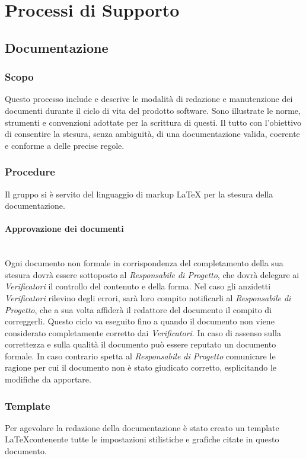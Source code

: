 \section{Processi di Supporto}


\subsection{Documentazione}
	
	\subsubsection{Scopo}
	Questo processo include e descrive le modalità di redazione e manutenzione dei documenti durante il ciclo di vita del prodotto software. Sono illustrate le norme, strumenti e convenzioni adottate per la scrittura di questi. Il tutto con l'obiettivo di consentire la stesura, senza ambiguità, di una documentazione valida, coerente e conforme a delle precise regole.
	
	\subsubsection{Procedure}
	Il gruppo si è servito del linguaggio di markup {\LaTeX} per la stesura della documentazione.
	
		\paragraph{Approvazione dei documenti} \mbox{} \\
		Ogni documento non formale in corrispondenza del completamento della sua stesura dovrà essere sottoposto al \textit{Responsabile di Progetto}, che dovrà delegare ai \textit{Verificatori} il controllo del contenuto e della forma. Nel caso gli anzidetti \textit{Verificatori} rilevino degli errori, sarà loro compito notificarli al \textit{Responsabile di Progetto}, che a sua volta affiderà il redattore del documento il compito di correggerli. Questo ciclo va eseguito fino a quando il documento non viene considerato completamente corretto dai  \textit{Verificatori}. In caso di assenso sulla correttezza e sulla qualità il documento può essere reputato un documento formale. In caso contrario spetta al \textit{Responsabile di Progetto} comunicare le ragione per cui il documento non è stato giudicato corretto, esplicitando le modifiche da apportare.
		
	\subsubsection{Template}
	Per agevolare la redazione della documentazione è stato creato un template \LaTeX contenente tutte le impostazioni stilistiche e grafiche citate in questo documento.
	
